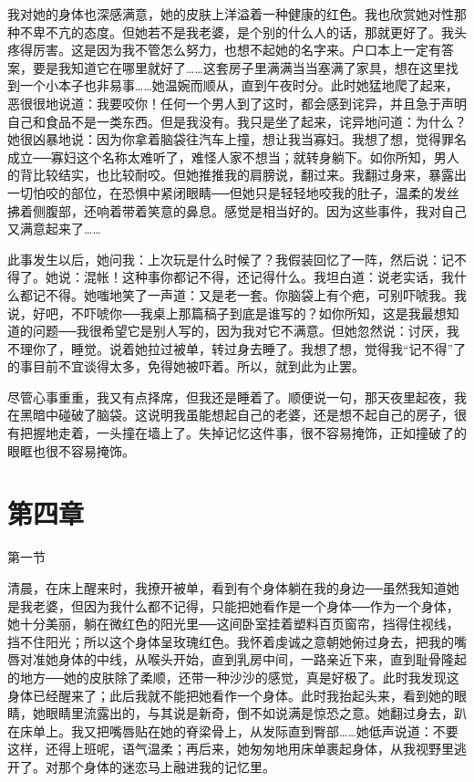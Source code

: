 我对她的身体也深感满意，她的皮肤上洋溢着一种健康的红色。我也欣赏她对性那种不卑不亢的态度。但她若不是我老婆，是个别的什么人的话，那就更好了。我头疼得厉害。这是因为我不管怎么努力，也想不起她的名字来。户口本上一定有答案，要是我知道它在哪里就好了……这套房子里满满当当塞满了家具，想在这里找到一个小本子也非易事……她温婉而顺从，直到午夜时分。此时她猛地爬了起来，恶很很地说道：我要咬你！任何一个男人到了这时，都会感到诧异，并且急于声明自己和食品不是一类东西。但是我没有。我只是坐了起来，诧异地问道：为什么？她很凶暴地说：因为你拿着脑袋往汽车上撞，想让我当寡妇。我想了想，觉得罪名成立──寡妇这个名称太难听了，难怪人家不想当；就转身躺下。如你所知，男人的背比较结实，也比较耐咬。但她推推我的肩膀说，翻过来。我翻过身来，暴露出一切怕咬的部位，在恐惧中紧闭眼睛──但她只是轻轻地咬我的肚子，温柔的发丝拂着侧腹部，还响着带着笑意的鼻息。感觉是相当好的。因为这些事件，我对自己又满意起来了…… 

此事发生以后，她问我：上次玩是什么时候了？我假装回忆了一阵，然后说：记不得了。她说：混帐！这种事你都记不得，还记得什么。我坦白道：说老实话，我什么都记不得。她嗤地笑了一声道：又是老一套。你脑袋上有个疤，可别吓唬我。我说，好吧，不吓唬你──我桌上那篇稿子到底是谁写的？如你所知，这是我最想知道的问题──我很希望它是别人写的，因为我对它不满意。但她忽然说：讨厌，我不理你了，睡觉。说着她拉过被单，转过身去睡了。我想了想，觉得我“记不得”了的事目前不宜谈得太多，免得她被吓着。所以，就到此为止罢。 

尽管心事重重，我又有点择席，但我还是睡着了。顺便说一句，那天夜里起夜，我在黑暗中碰破了脑袋。这说明我虽能想起自己的老婆，还是想不起自己的房子，很有把握地走着，一头撞在墙上了。失掉记忆这件事，很不容易掩饰，正如撞破了的眼眶也很不容易掩饰。

\section{第四章}

第一节 

清晨，在床上醒来时，我撩开被单，看到有个身体躺在我的身边──虽然我知道她是我老婆，但因为我什么都不记得，只能把她看作是一个身体──作为一个身体，她十分美丽，躺在微红色的阳光里──这间卧室挂着塑料百页窗帘，挡得住视线，挡不住阳光；所以这个身体呈玫瑰红色。我怀着虔诚之意朝她俯过身去，把我的嘴唇对准她身体的中线，从喉头开始，直到乳房中间，一路亲近下来，直到耻骨隆起的地方──她的皮肤除了柔顺，还带一种沙沙的感觉，真是好极了。此时我发现这身体已经醒来了；此后我就不能把她看作一个身体。此时我抬起头来，看到她的眼睛，她眼睛里流露出的，与其说是新奇，倒不如说满是惊恐之意。她翻过身去，趴在床单上。我又把嘴唇贴在她的脊梁骨上，从发际直到臀部……她低声说道：不要这样，还得上班呢，语气温柔；再后来，她匆匆地用床单裹起身体，从我视野里逃开了。对那个身体的迷恋马上融进我的记忆里。 

